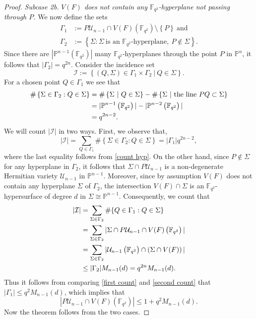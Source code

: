 \documentclass[10pt,a4paper,oneside]{amsproc}
\newcommand{\Fqt}{\mathbb{F}_{q^2}}
\newcommand{\I}{\mathcal{I}}
\newcommand{\U}{\mathcal{U}}
\def\PP{{\mathbb P}}
\begin{document}
\begin{proof}
        \textit{Subcase 2b.} \textit{$V(F)$ does not contain any $\Fqt$-hyperplane not passing through $P$.} We now define the sets 
        \begin{align*}
            \Gamma_1 &:=P\U_{n-1}\cap V(F)(\Fqt)\setminus \left\{P\right\} \ \text{and}\\
            \Gamma_2 &:= \left\{\Sigma: \Sigma \ \text{is an $\Fqt$-hyperplane},\ P\notin \Sigma \right\}.
        \end{align*}
Since there are $|\PP^{n-1}(\Fqt)|$ many $\Fqt$-hyperplanes through the point $P$ in $\PP^n$, it follows that $|\Gamma_2|=q^{2n}$. Consider the incidence set $$\I:=\left\{\left(Q,\Sigma\right)\in \Gamma_1\times \Gamma_2 \ | \ Q\in \Sigma  \right\}.$$ For a chosen point $Q\in \Gamma_1$ we see that 
\begin{align}
\#\left\{ \Sigma\in \Gamma_2: Q\in \Sigma \right\} &= \#\left\{ \Sigma\ |\  Q\in \Sigma \right\}-\#\left\{ \Sigma\ |\ \text{the line}\  PQ\subset \Sigma   \right\}\notag\\
         &=|\PP^{n-1}\left(\Fqt\right)|- |\PP^{n-2}\left(\Fqt\right)|\notag \\
         &=q^{2n-2}\label{count hyp}.
\end{align}
We will count $|\I|$ in two ways. First, we observe that, 
\begin{equation}\label{first count}
  |\I|=\sum_{Q\in \Gamma_1}\#\left\{ \Sigma\in\Gamma_2: Q\in \Sigma \right\}=|\Gamma_1|q^{2n-2},  
\end{equation}
where the last equality follows from \eqref{count hyp}. On the other hand, since $P\notin \Sigma$ for any hyperplane in $\Gamma_2$, it follows that $\Sigma\cap P\U_{n-1}$ is a non-degenerate Hermitian variety $\U_{n-1}$ in $\PP^{n-1}$. Moreover, since by assumption $V(F)$ does not contain any hyperplane $\Sigma$ of $\Gamma_2$, the intersection $V(F)\cap \Sigma$ is an $\Fqt$-hypersurface of degree $d$ in $\Sigma\cong\PP^{n-1}$. Consequently, we count that 
\begin{align}
    |\I|&=\sum_{\Sigma\in \Gamma_2}\#\{ Q\in \Gamma_1: Q\in \Sigma \}\notag\\
        &= \sum_{\Sigma\in \Gamma_2} |\Sigma\cap P\U_{n-1}\cap V(F)\left(\Fqt\right)| \notag\\
        &=\sum_{\Sigma\in \Gamma_2}|\U_{n-1}\left(\Fqt\right)\cap \left(\Sigma\cap V(F)  \right)|\notag\\
        &\leq |\Gamma_2| M_{n-1}(d)=q^{2n}M_{n-1}(d).\label{second count}
\end{align}
Thus it follows from comparing \eqref{first count} and \eqref{second count} that $|\Gamma_1|\leq q^2 M_{n-1}(d)$, which implies that $$|P\U_{n-1}\cap V(F)(\Fqt)|\leq 1+q^2M_{n-1}(d).$$ Now the theorem follows from the two cases.
\end{proof}
\end{document}
